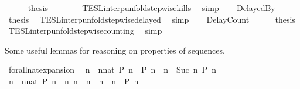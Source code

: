 \begin{isabellebody}
\ \ \ \ \isamarkupfalse%
\ {\isacharquery}thesis\isanewline
\ \ \ \ \ \ \isamarkupfalse%
\ TESL{\isacharunderscore}interp{\isacharunderscore}unfold{\isacharunderscore}stepwise{\isacharunderscore}kills\ \isamarkupfalse%
\ simp\isanewline
{}\isamarkupfalse%
\isanewline
\ \ \isamarkupfalse%
\ DelayedBy\isanewline
\ \ \ \ \isamarkupfalse%
\ {\isacharquery}thesis\ \isamarkupfalse%
\ TESL{\isacharunderscore}interp{\isacharunderscore}unfold{\isacharunderscore}stepwise{\isacharunderscore}delayed\ \isamarkupfalse%
\ simp\isanewline
{}\isamarkupfalse%
\isanewline
\ \ \isamarkupfalse%
\ DelayCount\isanewline
\ \ \ \ \isamarkupfalse%
\ {\isacharquery}thesis\ \isamarkupfalse%
\ TESL{\isacharunderscore}interp{\isacharunderscore}unfold{\isacharunderscore}stepwise{\isacharunderscore}counting\ \isamarkupfalse%
\ simp\isanewline
{}\isamarkupfalse%
%
\endisatagproof
{\isafoldproof}%
%
\isadelimproof
%
\endisadelimproof
%
\begin{isamarkuptext}%
Some useful lemmas for reasoning on properties of sequences.%
\end{isamarkuptext}\isamarkuptrue%
\isamarkupfalse%
\ forall{\isacharunderscore}nat{\isacharunderscore}expansion{\isacharcolon}\isanewline
\ \ {\isacartoucheopen}{\isacharparenleft}{\isasymforall}n\ {\isasymge}\ {\isacharparenleft}nnat{\isacharparenright}{\isachardot}\ P\ n{\isacharparenright}\ {\isacharequal}\ {\isacharparenleft}P\ n\ {\isasymand}\ {\isacharparenleft}{\isasymforall}n\ {\isasymge}\ Suc\ n\ P\ n{\isacharparenright}{\isacharparenright}{\isacartoucheclose}\isanewline
%
\isadelimproof
%
\endisadelimproof
%
\isatagproof
{}\isamarkupfalse%
\ {\isacharminus}\isanewline
\ \ \isamarkupfalse%
\ {\isacartoucheopen}{\isacharparenleft}{\isasymforall}n\ {\isasymge}\ {\isacharparenleft}nnat{\isacharparenright}{\isachardot}\ P\ n{\isacharparenright}\ {\isacharequal}\ {\isacharparenleft}{\isasymforall}n{\isachardot}\ {\isacharparenleft}n\ {\isacharequal}\ n\ {\isasymor}\ n\ {\isachargreater}\ n\ {\isasymlongrightarrow}\ P\ n{\isacharparenright}{\isacartoucheclose}\isanewline
\ \ \ \ \isamarkupfalse%

\end{isabellebody}
